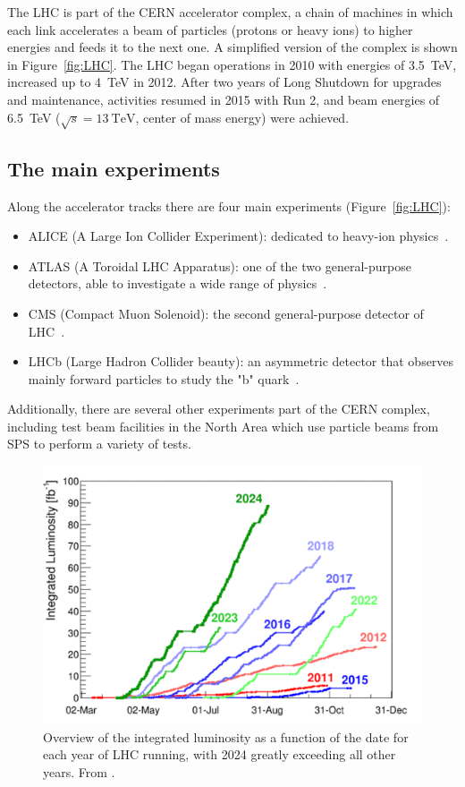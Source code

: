 The LHC is part of the CERN accelerator complex, a chain of machines in which each link accelerates a beam of particles (protons or heavy ions) to higher energies and feeds it to the next one. A simplified version of the complex is shown in Figure~\ref{fig:LHC}. The LHC began operations in 2010 with energies of \qty{3.5}{\tera\electronvolt}, increased up to \qty{4}{\tera\electronvolt} in 2012. After two years of Long Shutdown for upgrades and maintenance, activities resumed in 2015 with Run 2, and beam energies of \qty{6.5}{\tera\electronvolt} (\(\sqrt{s}=\qty{13}{\tera\electronvolt}\), center of mass energy) were achieved.


\subsection{The main experiments}\label{subsec:LHC_main_experiments}

Along the accelerator tracks there are four main experiments (Figure~\ref{fig:LHC}):
\begin{itemize}
    \item ALICE (A Large Ion Collider Experiment): dedicated to heavy-ion physics~\cite{aliceFrontpageAlicepublicwebcernch}.
    \item ATLAS (A Toroidal LHC Apparatus): one of the two general-purpose detectors, able to investigate a wide range of physics~\cite{atlasATLASExperiment}.
    \item CMS (Compact Muon Solenoid): the second general-purpose detector of LHC~\cite{cmsDetectorExperiment}.
    \item LHCb (Large Hadron Collider beauty): an asymmetric detector that observes mainly forward particles to study the "b" quark~\cite{cernLHCbCollaboration}.
\end{itemize}

Additionally, there are several other experiments part of the CERN complex, including test beam facilities in the North Area which use particle beams from SPS to perform a variety of tests.

\begin{figure}[h!tbpt]
    \centering
    \includegraphics[width=.6\linewidth]{Images/intro/integrated_luminosity.png}
    \captionsetup{width=\captionwidth}
    \caption{Overview of the integrated luminosity as a function of the date for each year of LHC running, with 2024 greatly exceeding all other years. From \cite{homeAcceleratorReport}.}
    \label{fig:integrated_luminosity}
\end{figure}

